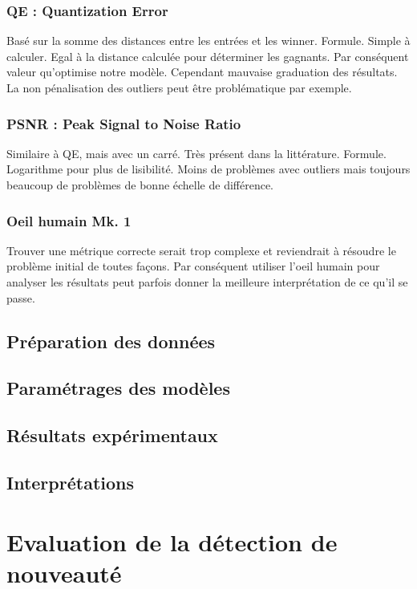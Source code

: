 	\subsubsection{QE : Quantization Error}

	Basé sur la somme des distances entre les entrées et les winner. Formule. Simple à calculer. Egal à la distance calculée pour déterminer les gagnants. Par conséquent valeur qu'optimise notre modèle. Cependant mauvaise graduation des résultats. La non pénalisation des outliers peut être problématique par exemple.

	\subsubsection{PSNR : Peak Signal to Noise Ratio}

	Similaire à QE, mais avec un carré. Très présent dans la littérature. Formule. Logarithme pour plus de lisibilité. Moins de problèmes avec outliers mais toujours beaucoup de problèmes de bonne échelle de différence.

	\subsubsection{Oeil humain Mk. 1}

	Trouver une métrique correcte serait trop complexe et reviendrait à résoudre le problème initial de toutes façons. Par conséquent utiliser l'oeil humain pour analyser les résultats peut parfois donner la meilleure interprétation de ce qu'il se passe.

	\subsection{Préparation des données}
	\subsection{Paramétrages des modèles}
	\subsection{Résultats expérimentaux}
	\subsection{Interprétations}
	\section{Evaluation de la détection de nouveauté}
